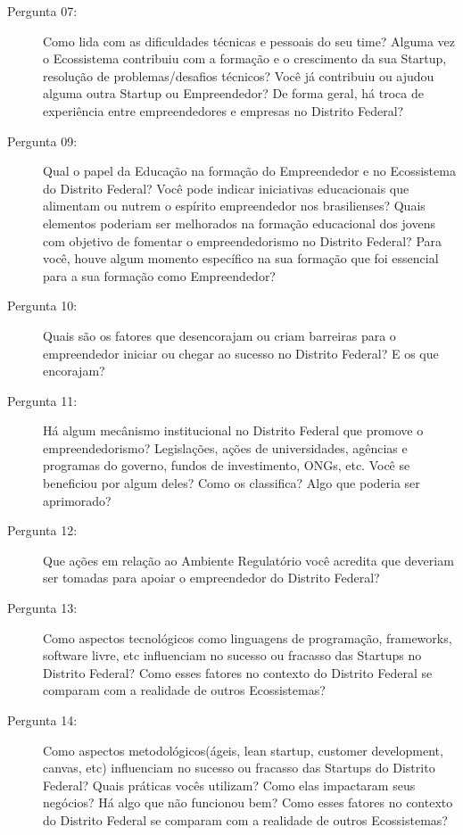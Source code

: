 \begin{description}
  \item [Pergunta 07:] Como lida com as dificuldades técnicas e pessoais do seu time? Alguma vez o Ecossistema contribuiu com a formação e o crescimento da sua Startup, resolução de problemas/desafios técnicos? Você já contribuiu ou ajudou alguma outra Startup ou Empreendedor? De forma geral, há troca de experiência entre empreendedores e empresas no Distrito Federal? 
  
  \item [Pergunta 09:] Qual o papel da Educação na formação do Empreendedor e no Ecossistema do Distrito Federal? Você pode indicar iniciativas educacionais que alimentam ou nutrem o espírito empreendedor nos brasilienses? Quais elementos poderiam ser melhorados na formação educacional dos jovens com objetivo de fomentar o empreendedorismo no Distrito Federal? Para você, houve algum momento específico na sua formação que foi essencial para a sua formação como Empreendedor?

  \item [Pergunta 10:] Quais são os fatores que desencorajam ou criam barreiras para o empreendedor iniciar ou chegar ao sucesso no Distrito Federal? E os que encorajam?
  
  \item [Pergunta 11:] Há algum mecânismo institucional no Distrito Federal que promove o empreendedorismo? Legislações, ações de universidades, agências e programas do governo, fundos de investimento, ONGs, etc. Você se beneficiou por algum deles? Como os classifica? Algo que poderia ser aprimorado?

  \item [Pergunta 12:] Que ações em relação ao Ambiente Regulatório você acredita que deveriam ser tomadas para apoiar o empreendedor do Distrito Federal?
    
  \item [Pergunta 13:] Como aspectos tecnológicos como linguagens de programação, frameworks, software livre, etc influenciam no sucesso ou fracasso das Startups no Distrito Federal? Como esses fatores no contexto do Distrito Federal se comparam com a realidade de outros Ecossistemas? 
  
  \item [Pergunta 14:] Como aspectos metodológicos(ágeis, lean startup, customer development, canvas, etc) influenciam no sucesso ou fracasso das Startups do Distrito Federal? Quais práticas vocês utilizam? Como elas impactaram seus negócios? Há algo que não funcionou bem? Como esses fatores no contexto do Distrito Federal se comparam com a realidade de outros Ecossistemas?


\end{description}
